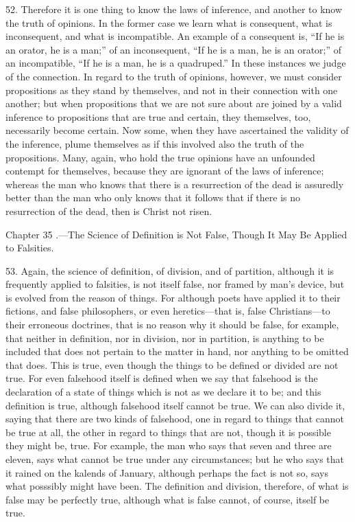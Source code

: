 52. Therefore it is one thing to know the laws of inference, and another to know the truth of opinions. In the former case we learn what is consequent, what is inconsequent, and what is incompatible. An example of a consequent is, “If he is an orator, he is a man;” of an inconsequent, “If he is a man, he is an orator;” of an incompatible, “If he is a man, he is a quadruped.” In these instances we judge of the connection. In regard to the truth of opinions, however, we must consider propositions as they stand by themselves, and not in their connection with one another; but when propositions that we are not sure about are joined by a valid inference to propositions that are true and certain, they themselves, too, necessarily become certain. Now some, when they have ascertained the validity of the inference, plume themselves as if this involved also the truth of the propositions. Many, again, who hold the true opinions have an unfounded contempt for themselves, because they are ignorant of the laws of inference; whereas the man who knows that there is a resurrection of the dead is assuredly better than the man who only knows that it follows that if there is no resurrection of the dead, then is Christ not risen.


Chapter 35 .—The Science of Definition is Not False, Though It May Be Applied to Falsities.

53. Again, the science of definition, of division, and of partition, although it is frequently applied to falsities, is not itself false, nor framed by man’s device, but is evolved from the reason of things. For although poets have applied it to their fictions, and false philosophers, or even heretics—that is, false Christians—to their erroneous doctrines, that is no reason why it should be false, for example, that neither in definition, nor in division, nor in partition, is anything to be included that does not pertain to the matter in hand, nor anything to be omitted that does. This is true, even though the things to be defined or divided are not true. For even falsehood itself is defined when we say that falsehood is the declaration of a state of things which is not as we declare it to be; and this definition is true, although falsehood itself cannot be true. We can also divide it, saying that there are two kinds of falsehood, one in regard to things that cannot be true at all, the other in regard to things that are not, though it is possible they might be, true. For example, the man who says that seven and three are eleven, says what cannot be true under any circumstances; but he who says that it rained on the kalends of January, although perhaps the fact is not so, says what posssibly might have been. The definition and division, therefore, of what is false may be perfectly true, although what is false cannot, of course, itself be true.

